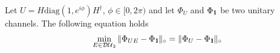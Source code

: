 \documentclass[preprint,12pt, a4paper]{elsarticle}
\newcommand{\1}{{\rm 1\hspace{-0.9mm}l}}
\newcommand{\Id}{{\rm 1\hspace{-0.9mm}l}}
\newcommand{\HH}{\mathcal{H}}
\newcommand{\diaguni}{\ensuremath{\mathcal{DU}}}
\newcommand{\diag}{\mathrm{diag}}
\newcommand{\tr}{\mathrm{tr}}
\newtheorem{proposition}{Proposition}
\begin{document}
 Let $U = H \diag(1, e^{i \phi}) H^\dagger$, $\phi \in [0, 2\pi)$ and	let 
 $\Phi_U$ and $\Phi_\Id$ be two unitary channels. The following equation holds 
	\begin{equation}
	\min_{E \in \diaguni_2} \|\Phi_{UE} - 
	\Phi_\Id\|_\diamond = \|\Phi_{U} - 
	\Phi_\Id\|_\diamond
	\end{equation}



%
\end{document}
